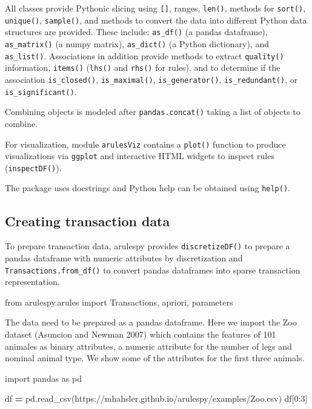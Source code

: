 \documentclass{article}
\newenvironment{Shaded}{\begin{snugshade}}{\end{snugshade}}
\newcommand{\DecValTok}[1]{\textcolor[rgb]{0.00,0.00,0.81}{#1}}
\newcommand{\ImportTok}[1]{#1}
\newcommand{\NormalTok}[1]{#1}
\newcommand{\OperatorTok}[1]{\textcolor[rgb]{0.81,0.36,0.00}{\textbf{#1}}}
\newcommand{\StringTok}[1]{\textcolor[rgb]{0.31,0.60,0.02}{#1}}
\begin{document}
All classes provide Pythonic slicing using \texttt{{[}{]}}, ranges,
\texttt{len()}, methods for \texttt{sort()}, \texttt{unique()},
\texttt{sample()}, and methods to convert the data into different Python
data structures are provided. These include: \texttt{as\_df()} (a pandas
dataframe), \texttt{as\_matrix()} (a numpy matrix), \texttt{as\_dict()}
(a Python dictionary), and \texttt{as\_list()}. Associations in addition
provide methods to extract \texttt{quality()} information,
\texttt{items()} (\texttt{lhs()} and \texttt{rhs()} for rules), and to
determine if the association \texttt{is\_closed()},
\texttt{is\_maximal()}, \texttt{is\_generator()},
\texttt{is\_redundant()}, or \texttt{is\_significant()}.

Combining objects is modeled after \texttt{pandas.concat()} taking a
list of objects to combine.

For visualization, module \texttt{arulesViz} contains a \texttt{plot()}
function to produce visualizations via \texttt{ggplot} and interactive
HTML widgets to inspect rules (\texttt{inspectDF()}).

The package uses docstrings and Python help can be obtained using
\texttt{help()}.

\hypertarget{creating-transaction-data}{%
\subsection{Creating transaction data}\label{creating-transaction-data}}

To prepare transaction data, arulespy provides \texttt{discretizeDF()}
to prepare a pandas dataframe with numeric attributes by discretization
and \texttt{Transactions.from\_df()} to convert pandas dataframes into
sparse transaction representation.

\begin{Shaded}
\begin{Highlighting}[]
\ImportTok{from}\NormalTok{ arulespy.arules }\ImportTok{import}\NormalTok{ Transactions, apriori, parameters}
\end{Highlighting}
\end{Shaded}

The data need to be prepared as a pandas dataframe. Here we import the
Zoo dataset (Asuncion and Newman 2007) which contains the features of
101 animales as binary attributes, a numeric attribute for the number of
legs and nominal animal type. We show some of the attributes for the
first three animals.

\begin{Shaded}
\begin{Highlighting}[]
\ImportTok{import}\NormalTok{ pandas }\ImportTok{as}\NormalTok{ pd}

\NormalTok{df }\OperatorTok{=}\NormalTok{ pd.read\_csv(}\StringTok{\textquotesingle{}https://mhahsler.github.io/arulespy/examples/Zoo.csv\textquotesingle{}}\NormalTok{)}
\NormalTok{df[}\DecValTok{0}\NormalTok{:}\DecValTok{3}\NormalTok{]}
\end{Highlighting}
\end{Shaded}
\end{document}
